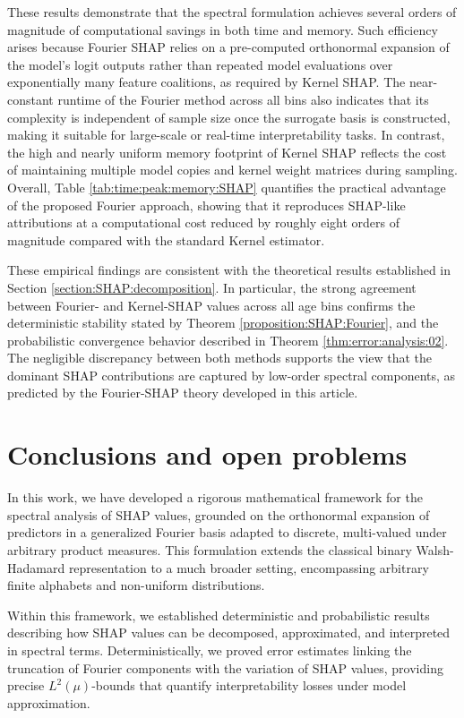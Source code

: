 \documentclass[letterpaper,11pt]{article}
\numberwithin{equation}{section}
\numberwithin{equation}{section}
\begin{document}
These results demonstrate that the spectral formulation achieves several orders of magnitude of computational savings in both time and memory.
Such efficiency arises because Fourier SHAP relies on a pre-computed orthonormal expansion of the model’s logit outputs rather than repeated model evaluations over exponentially many feature coalitions, as required by Kernel SHAP.
The near-constant runtime of the Fourier method across all bins also indicates that its complexity is independent of sample size once the surrogate basis is constructed, making it suitable for large-scale or real-time interpretability tasks.
In contrast, the high and nearly uniform memory footprint of Kernel SHAP reflects the cost of maintaining multiple model copies and kernel weight matrices during sampling.
Overall, Table \ref{tab:time:peak:memory:SHAP} quantifies the practical advantage of the proposed Fourier approach, showing that it reproduces SHAP-like attributions at a computational cost reduced by roughly eight orders of magnitude compared with the standard Kernel estimator.

These empirical findings are consistent with the theoretical results established in Section \ref{section:SHAP:decomposition}. In particular, the strong agreement between Fourier- and Kernel-SHAP values across all age bins confirms the deterministic stability stated by Theorem \ref{proposition:SHAP:Fourier}, and the probabilistic convergence behavior described in Theorem \ref{thm:error:analysis:02}. The negligible discrepancy between both methods supports the view that the dominant SHAP contributions are captured by low-order spectral components, as predicted by the Fourier-SHAP theory developed in this article. 


\section{Conclusions and open problems}
In this work, we have developed a rigorous mathematical framework for the spectral analysis of SHAP values, grounded on the orthonormal expansion of predictors in a generalized Fourier basis adapted to discrete, multi-valued under arbitrary product measures. This formulation extends the classical binary Walsh-Hadamard representation to a much broader setting, encompassing arbitrary finite alphabets and non-uniform distributions.

Within this framework, we established deterministic and probabilistic results describing how SHAP values can be decomposed, approximated, and interpreted in spectral terms. Deterministically, we proved error estimates linking the truncation of Fourier components with the variation of SHAP values, providing precise $L^2(\mu)$-bounds that quantify interpretability losses under model approximation.
\end{document}
